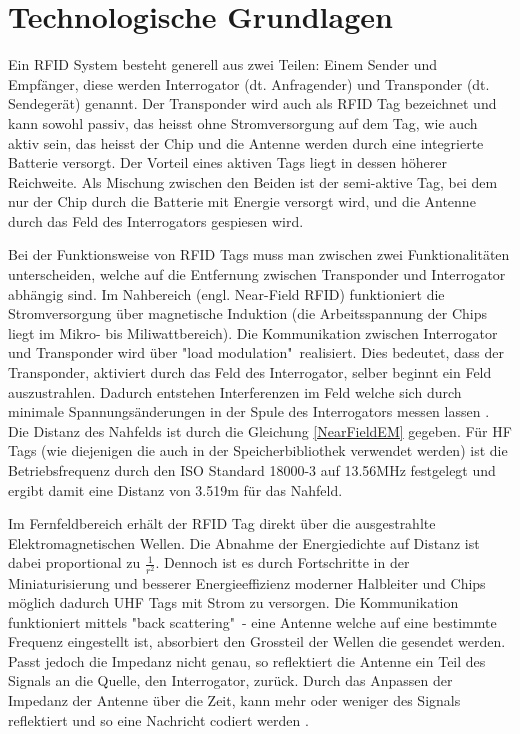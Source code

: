 \section{Technologische Grundlagen}

Ein \gls{RFID} System besteht generell aus zwei Teilen: Einem Sender und Empfänger, diese werden Interrogator (dt. Anfragender) und Transponder (dt. Sendegerät) genannt. Der Transponder wird auch als \gls{RFID} Tag bezeichnet und kann sowohl passiv, das heisst ohne Stromversorgung auf dem Tag, wie auch aktiv sein, das heisst der Chip und die Antenne werden durch eine integrierte Batterie versorgt. Der Vorteil eines aktiven Tags liegt in dessen höherer Reichweite. Als Mischung zwischen den Beiden ist der semi-aktive Tag, bei dem nur der Chip durch die Batterie mit Energie versorgt wird, und die Antenne durch das Feld des Interrogators gespiesen wird.

Bei der Funktionsweise von \gls{RFID} Tags muss man zwischen zwei Funktionalitäten unterscheiden, welche auf die Entfernung zwischen Transponder und Interrogator abhängig sind. Im Nahbereich (engl. Near-Field \gls{RFID}) funktioniert die Stromversorgung über magnetische Induktion (die Arbeitsspannung der Chips liegt im Mikro- bis Miliwattbereich). Die Kommunikation zwischen Interrogator und Transponder wird über "load modulation"\ realisiert. Dies bedeutet, dass der Transponder, aktiviert durch das Feld des Interrogator, selber beginnt ein Feld auszustrahlen. Dadurch entstehen Interferenzen im Feld welche sich durch minimale Spannungsänderungen in der Spule des Interrogators messen lassen \parencite{want2006}. Die Distanz des Nahfelds ist durch die Gleichung \ref{NearFieldEM} gegeben. Für \gls{HF} Tags (wie diejenigen die auch in der Speicherbibliothek verwendet werden) ist die Betriebsfrequenz durch den ISO Standard 18000-3 auf 13.56MHz festgelegt und ergibt damit eine Distanz von 3.519m für das Nahfeld.


Im Fernfeldbereich erhält der \gls{RFID} Tag direkt über die ausgestrahlte Elektromagnetischen Wellen. Die Abnahme der Energiedichte auf Distanz ist dabei proportional zu $\frac{1}{r^2}$. Dennoch ist es durch Fortschritte in der Miniaturisierung und besserer Energieeffizienz moderner Halbleiter und Chips möglich dadurch \gls{UHF} Tags mit Strom zu versorgen. Die Kommunikation funktioniert mittels "back scattering"\ - eine Antenne welche auf eine bestimmte Frequenz eingestellt ist, absorbiert den Grossteil der Wellen die gesendet werden. Passt jedoch die Impedanz nicht genau, so reflektiert die Antenne ein Teil des Signals an die Quelle, den Interrogator, zurück. Durch das Anpassen der Impedanz der Antenne über die Zeit, kann mehr oder weniger des Signals reflektiert und so eine Nachricht codiert werden \parencite{want2006}.


